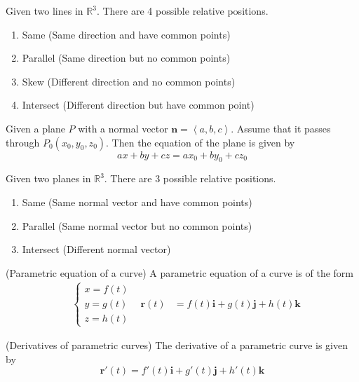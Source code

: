 \documentclass{huhtakm-template-book}
\begin{document}
\begin{thm}
    Given two lines in $\mathbb{R}^{3}$. There are 4 possible relative positions.
    \begin{enumerate}
        \item Same (Same direction and have common points)
        \item Parallel (Same direction but no common points)
        \item Skew (Different direction and no common points)
        \item Intersect (Different direction but have common point)
    \end{enumerate}
\end{thm}
\begin{defn}
    Given a plane $P$ with a normal vector $\mathbf{n}=\left<a,b,c\right>$. Assume that it passes through $P_{0}(x_{0},y_{0},z_{0})$. Then the equation of the plane is given by
    \begin{equation*}
        ax+by+cz=ax_{0}+by_{0}+cz_{0}
    \end{equation*}
\end{defn}
\begin{thm}
    Given two planes in $\mathbb{R}^{3}$. There are 3 possible relative positions.
    \begin{enumerate}
        \item Same (Same normal vector and have common points)
        \item Parallel (Same normal vector but no common points)
        \item Intersect (Different normal vector)
    \end{enumerate}
\end{thm}
\begin{defn}(Parametric equation of a curve)
    A parametric equation of a curve is of the form
    \begin{align*}
        &\begin{cases}
            x=f(t)\\
            y=g(t)\\
            z=h(t)
        \end{cases} & \mathbf{r}(t)&=f(t)\mathbf{i}+g(t)\mathbf{j}+h(t)\mathbf{k}
    \end{align*}
\end{defn}
\begin{defn}(Derivatives of parametric curves)
    The derivative of a parametric curve is given by
    \begin{equation*}
        \mathbf{r}'(t)=f'(t)\mathbf{i}+g'(t)\mathbf{j}+h'(t)\mathbf{k}
    \end{equation*}
\end{defn}
\end{document}
